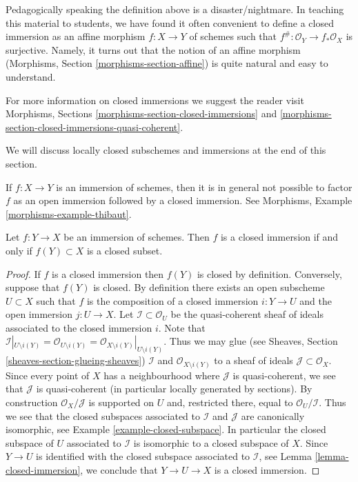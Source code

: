 \medskip\noindent
Pedagogically speaking the definition above is a disaster/nightmare.
In teaching this material to students, we have found it often
convenient to define a closed immersion as an affine morphism
$f : X \to Y$ of schemes such that $f^\# : \mathcal{O}_Y \to f_*\mathcal{O}_X$
is surjective. Namely, it turns out that the notion of an affine
morphism (Morphisms, Section \ref{morphisms-section-affine})
is quite natural and easy to understand.

\medskip\noindent
For more information on closed immersions we suggest the reader visit
Morphisms, Sections \ref{morphisms-section-closed-immersions} and
\ref{morphisms-section-closed-immersions-quasi-coherent}.

\medskip\noindent
We will discuss locally closed subschemes and immersions
at the end of this section.

\begin{remark}
\label{remark-not-reverse-open-closed}
If $f : X \to Y$ is an immersion of schemes, then it is in general
not possible to factor $f$ as an open immersion followed
by a closed immersion. See Morphisms, Example \ref{morphisms-example-thibaut}.
\end{remark}

\begin{lemma}
\label{lemma-immersion-when-closed}
Let $f : Y \to X$ be an immersion of schemes. Then $f$ is a closed
immersion if and only if $f(Y) \subset X$ is a closed subset.
\end{lemma}

\begin{proof}
If $f$ is a closed immersion then $f(Y)$ is closed by definition.
Conversely, suppose that $f(Y)$ is closed. By definition
there exists an open subscheme $U \subset X$ such that $f$ is the composition
of a closed immersion $i : Y \to U$ and the open immersion
$j : U \to X$. Let $\mathcal{I} \subset \mathcal{O}_U$ be the
quasi-coherent sheaf of ideals associated to the closed immersion
$i$. Note that
$\mathcal{I}|_{U \setminus i(Y)}
= \mathcal{O}_{U \setminus i(Y)}
= \mathcal{O}_{X \setminus i(Y)}|_{U \setminus i(Y)}$.
Thus we may glue (see Sheaves, Section \ref{sheaves-section-glueing-sheaves})
$\mathcal{I}$ and $\mathcal{O}_{X \setminus i(Y)}$ to a sheaf of
ideals $\mathcal{J} \subset \mathcal{O}_X$. Since every
point of $X$ has a neighbourhood where $\mathcal{J}$ is
quasi-coherent, we see that $\mathcal{J}$ is quasi-coherent
(in particular locally generated by sections).
By construction $\mathcal{O}_X/\mathcal{J}$ is supported
on $U$ and, restricted there, equal to $\mathcal{O}_U/\mathcal{I}$.
Thus we see that the closed subspaces associated to $\mathcal{I}$
and $\mathcal{J}$ are canonically isomorphic, see
Example \ref{example-closed-subspace}.
In particular the closed subspace of $U$ associated to $\mathcal{I}$
is isomorphic to a closed subspace of $X$.
Since $Y \to U$ is identified with the closed subspace
associated to $\mathcal{I}$, see Lemma \ref{lemma-closed-immersion},
we conclude that $Y \to U \to X$
is a closed immersion.
\end{proof}

